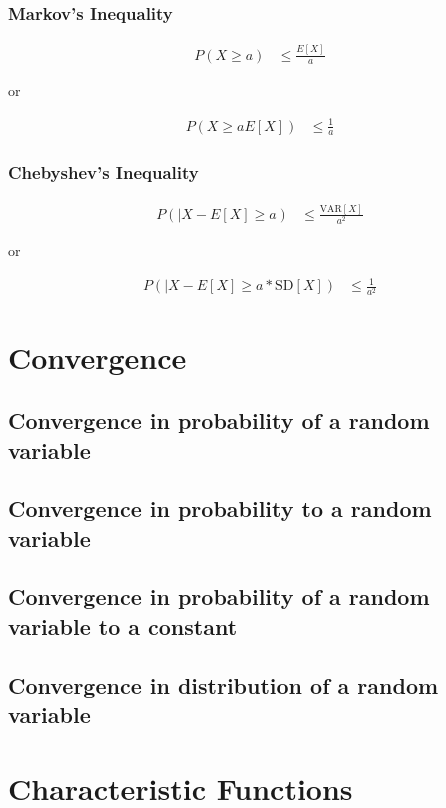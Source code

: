 \documentclass[10pt,a4paper]{book}
\begin{document}
\subsection{Markov's Inequality}

\begin{align}
P(X \ge a) &\le \frac{E[X]}{a}
\end{align}

or 

\begin{align}
P(X \ge aE[X]) &\le \frac{1}{a}
\end{align}

\subsection{Chebyshev's Inequality}

\begin{align}
P(|X - E[X] \ge a) &\le \frac{\text{VAR}[X]}{a^2}
\end{align}

or

\begin{align}
P(|X - E[X] \ge a*\text{SD}[X]) &\le \frac{1}{a^2}
\end{align}

	\chapter{Convergence}
	\section{Convergence in probability of a random variable}
	\section{Convergence in probability to a random variable}
	\section{Convergence in probability of a random variable to a constant}
	\section{Convergence in distribution of a random variable}
	
	\chapter{Characteristic Functions}
\end{document}
